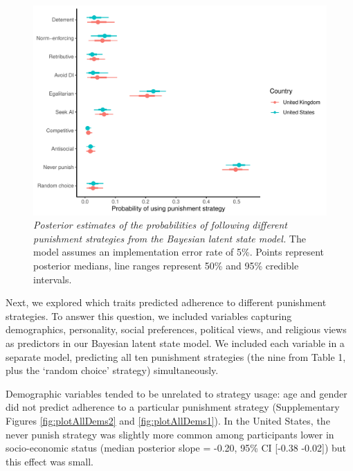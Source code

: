 \documentclass[
  man,floatsintext]{apa6}
\begin{document}
\begin{figure}
\centering
\includegraphics{manuscript_files/figure-latex/plotModel1b-1.pdf}
\caption{\label{fig:plotModel1b}\emph{Posterior estimates of the probabilities of following
different punishment strategies from the Bayesian latent state model.} The model
assumes an implementation error rate of 5\%. Points represent posterior medians,
line ranges represent 50\% and 95\% credible intervals.}
\end{figure}

Next, we explored which traits predicted adherence to different punishment
strategies. To answer this question, we included variables capturing
demographics, personality, social preferences, political views, and religious
views as predictors in our Bayesian latent state model. We included each
variable in a separate model, predicting all ten punishment strategies
(the nine from Table 1, plus the `random choice' strategy) simultaneously.

Demographic variables tended to be unrelated to strategy usage: age and gender
did not predict adherence to a particular punishment strategy (Supplementary
Figures \ref{fig:plotAllDems2} and \ref{fig:plotAllDems1}). In the United
States, the never punish strategy was slightly more common among participants
lower in socio-economic status (median posterior slope =
-0.20, 95\% CI {[}-0.38
-0.02{]}) but this effect was small.
\end{document}
